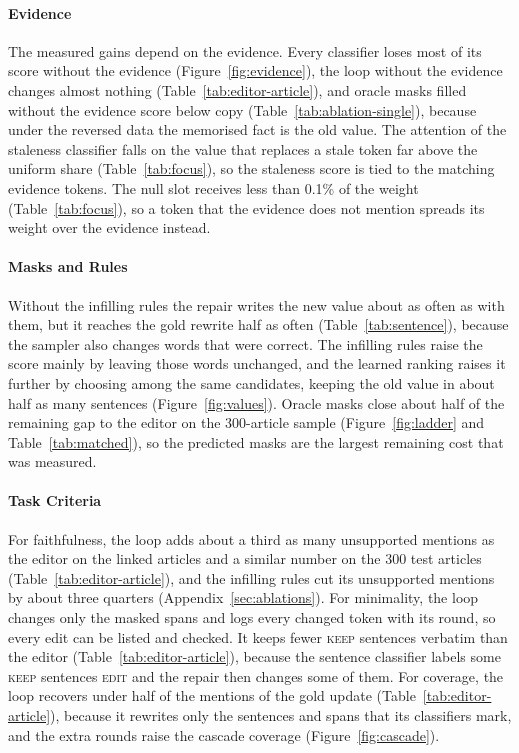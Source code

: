 \documentclass[11pt]{article}
\newcommand{\keep}{\textsc{keep}}
\newcommand{\edit}{\textsc{edit}}
\begin{document}
\paragraph{Evidence}
The measured gains depend on the evidence. Every classifier loses most of its score without the evidence (Figure~\ref{fig:evidence}), the loop without the evidence changes almost nothing (Table~\ref{tab:editor-article}), and oracle masks filled without the evidence score below copy (Table~\ref{tab:ablation-single}), because under the reversed data the memorised fact is the old value. The attention of the staleness classifier falls on the value that replaces a stale token far above the uniform share (Table~\ref{tab:focus}), so the staleness score is tied to the matching evidence tokens. The null slot receives less than 0.1\% of the weight (Table~\ref{tab:focus}), so a token that the evidence does not mention spreads its weight over the evidence instead.

\paragraph{Masks and Rules}
Without the infilling rules the repair writes the new value about as often as with them, but it reaches the gold rewrite half as often (Table~\ref{tab:sentence}), because the sampler also changes words that were correct. The infilling rules raise the score mainly by leaving those words unchanged, and the learned ranking raises it further by choosing among the same candidates, keeping the old value in about half as many sentences (Figure~\ref{fig:values}). Oracle masks close about half of the remaining gap to the editor on the 300-article sample (Figure~\ref{fig:ladder} and Table~\ref{tab:matched}), so the predicted masks are the largest remaining cost that was measured.

\paragraph{Task Criteria}
For faithfulness, the loop adds about a third as many unsupported mentions as the editor on the linked articles and a similar number on the 300 test articles (Table~\ref{tab:editor-article}), and the infilling rules cut its unsupported mentions by about three quarters (Appendix~\ref{sec:ablations}). For minimality, the loop changes only the masked spans and logs every changed token with its round, so every edit can be listed and checked. It keeps fewer \keep{} sentences verbatim than the editor (Table~\ref{tab:editor-article}), because the sentence classifier labels some \keep{} sentences \edit{} and the repair then changes some of them. For coverage, the loop recovers under half of the mentions of the gold update (Table~\ref{tab:editor-article}), because it rewrites only the sentences and spans that its classifiers mark, and the extra rounds raise the cascade coverage (Figure~\ref{fig:cascade}).
\end{document}
